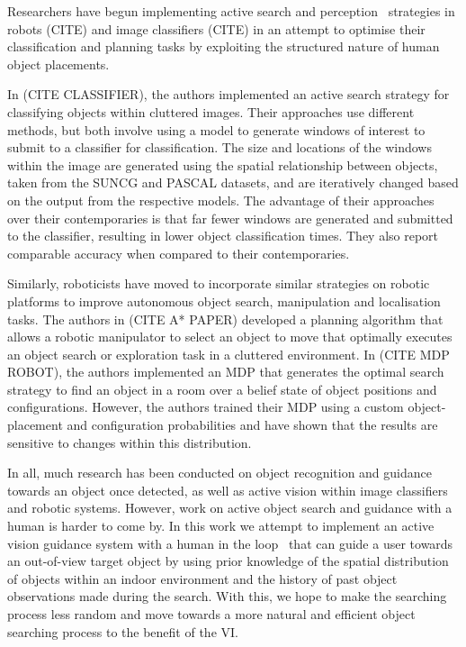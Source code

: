 \documentclass[a4paper, twoside]{article}
\begin{document}
Researchers have begun implementing active search and perception~\cite{aloimonos2013active} strategies in robots (CITE) and image classifiers (CITE) in an attempt to optimise their classification and planning tasks by exploiting the structured nature of human object placements. 

In (CITE CLASSIFIER), the authors implemented an active search strategy for classifying objects within cluttered images. Their approaches use different methods, but both involve using a model to generate windows of interest to submit to a classifier for classification. The size and locations of the windows within the image are generated using the spatial relationship between objects, taken from the SUNCG and PASCAL datasets, and are iteratively changed based on the output from the respective models. The advantage of their approaches over their contemporaries is that far fewer windows are generated and submitted to the classifier, resulting in lower object classification times. They also report comparable accuracy when compared to their contemporaries. 

Similarly, roboticists have moved to incorporate similar strategies on robotic platforms to improve autonomous object search, manipulation and localisation tasks. The authors in (CITE A* PAPER) developed a planning algorithm that allows a robotic manipulator to select an object to move that optimally executes an object search or exploration task in a cluttered environment. In (CITE MDP ROBOT), the authors implemented an MDP that generates the optimal search strategy to find an object in a room over a belief state of object positions and configurations. However, the authors trained their MDP using a custom object-placement and configuration probabilities and have shown that the results are sensitive to changes within this distribution. 

In all, much research has been conducted on object recognition and guidance towards an object once detected, as well as active vision within image classifiers and robotic systems. However, work on active object search and guidance with a human is harder to come by. In this work we attempt to implement an active vision guidance system with a human in the loop~\cite{bellotto2013,lock2017portable} that can guide a user towards an out-of-view target object by using prior knowledge of the spatial distribution of objects within an indoor environment and the history of past object observations made during the search. With this, we hope to make the searching process less random and move towards a more natural and efficient object searching process to the benefit of the VI\@.  
\end{document}
